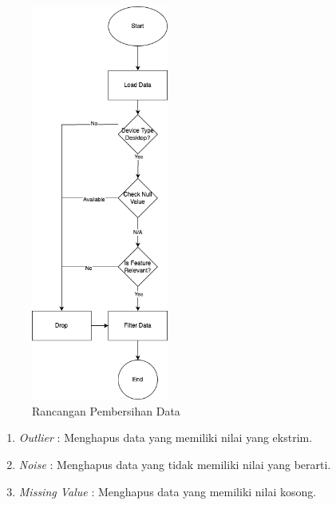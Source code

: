 \begin{figure}[H]
    \centering
    \includegraphics[width=0.4\textwidth]{contents/chapter-4/pre-processing.png}
    \caption{Rancangan Pembersihan Data}
    \label{fig:pembersihan-data}
\end{figure}

\begin{enumerate}
    \item \textit{Outlier} : Menghapus data yang memiliki nilai yang ekstrim.
    \item \textit{Noise} : Menghapus data yang tidak memiliki nilai yang berarti.
    \item \textit{Missing Value} : Menghapus data yang memiliki nilai kosong.
\end{enumerate}

